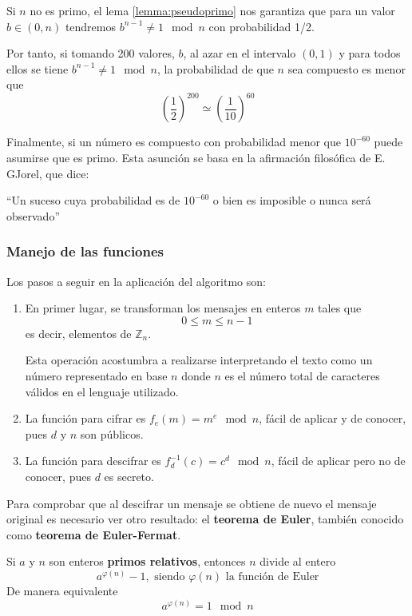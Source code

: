 \documentclass[nochap]{apuntesURJC}
\begin{document}
Si $n$ no es primo, el lema \ref{lemma:pseudoprimo} nos garantiza que para un valor $b \in (0,n)$ tendremos $b^{n-1}\neq 1 \mod n$ con probabilidad 1/2.

Por tanto, si tomando 200 valores, $b$, al azar en el intervalo $(0,1)$ y para todos ellos se tiene $b^{n-1}\neq 1 \mod n$, la probabilidad de que $n$ sea compuesto es menor que
\[\left( \frac{1}{2} \right)^{200} \simeq \left( \frac{1}{10}\right) ^{60}\]

Finalmente, si un número es compuesto con probabilidad menor que $10^{-60}$ puede asumirse que es primo. Esta asunción se basa en la afirmación filosófica de E. GJorel, que dice:
\begin{center}
``Un suceso cuya probabilidad es de $10^{-60}$ o bien es imposible o nunca será observado''
\end{center}

\subsubsection{Manejo de las funciones}

Los pasos a seguir en la aplicación del algoritmo son:
\begin{enumerate}
\item En primer lugar, se transforman los mensajes en enteros $m$ tales que
\[0 \leq m \leq n-1\]
es decir, elementos de $\mathbb{Z}_n$.

Esta operación acostumbra a realizarse interpretando el texto como un número representado en base $n$ donde $n$ es el número total de caracteres válidos en el lenguaje utilizado.

\item La función para cifrar es $f_e(m)=m^e \mod n$, fácil de aplicar y de conocer, pues $d$ y $n$ son públicos.

\item La función para descifrar es $f_d^{-1}(c)=c^d \mod n$, fácil de aplicar pero no de conocer, pues $d$ es secreto.

\end{enumerate}

Para comprobar que al descifrar un mensaje se obtiene de nuevo el mensaje original es necesario ver otro resultado: el \textbf{teorema de Euler}, también conocido como \textbf{teorema de Euler-Fermat}.

\begin{theorem}
Si $a$ y $n$ son enteros \textbf{primos relativos}, entonces $n$ divide al entero
\[a^{\varphi(n)}-1, \text{ siendo } \varphi(n) \text{ la función de Euler}\]
De manera equivalente
\[a^{\varphi(n)}=1 \mod n\]
\end{theorem}
\end{document}
